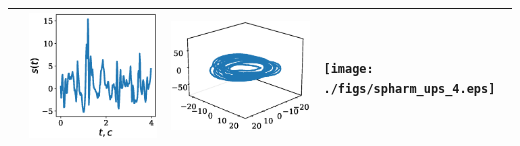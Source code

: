 \documentclass[12pt,twoside]{article}
\begin{document}
\begin{table}
\begin{tabular}{p{0.5cm}p{3cm}p{4cm}p{4cm}}
    & \includegraphics[scale=0.3]{./figs/time_series_ups_4.eps}
    & \includegraphics[scale=0.35]{./figs/phase_traj_ups_4.eps}
    & \texttt{[image: ./figs/spharm\_ups\_4.eps]}
    \\ 
    \hline
\end{tabular}
\label{tbl:table_of_figures}
\end{table}
\end{document}
